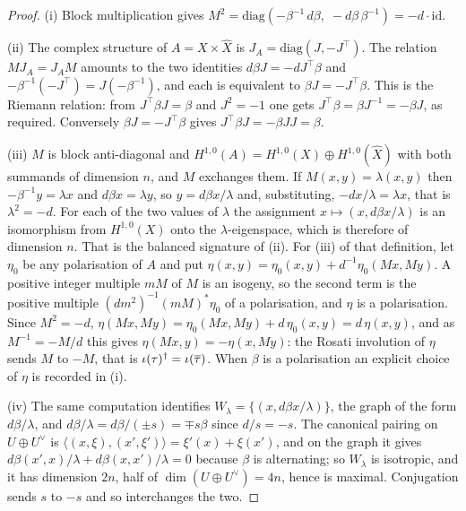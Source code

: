 \begin{proof}
(i) Block multiplication gives
$M^{2}=\mathrm{diag}(-\beta^{-1}\,d\beta,\;-d\beta\,\beta^{-1})=-d\cdot\mathrm{id}$.

(ii) The complex structure of $A=X\times\widehat{X}$ is
$J_{A}=\mathrm{diag}(J,-J^{\top})$. The relation $MJ_{A}=J_{A}M$ amounts to
the two identities $d\beta J=-dJ^{\top}\beta$ and
$-\beta^{-1}(-J^{\top})=J(-\beta^{-1})$, and each is equivalent to
$\beta J=-J^{\top}\beta$. This is the Riemann relation: from
$J^{\top}\beta J=\beta$ and $J^{2}=-1$ one gets
$J^{\top}\beta=\beta J^{-1}=-\beta J$, as required. Conversely
$\beta J=-J^{\top}\beta$ gives $J^{\top}\beta J=-\beta J J=\beta$.

(iii) $M$ is block anti-diagonal and $H^{1,0}(A)=H^{1,0}(X)\oplus
H^{1,0}(\widehat{X})$ with both summands of dimension $n$, and $M$ exchanges
them. If $M(x,y)=\lambda(x,y)$ then $-\beta^{-1}y=\lambda x$ and
$d\beta x=\lambda y$, so $y=d\beta x/\lambda$ and, substituting,
$-dx/\lambda=\lambda x$, that is $\lambda^{2}=-d$. For each of
the two values of $\lambda$ the assignment $x\mapsto(x,d\beta x/\lambda)$ is an
isomorphism from $H^{1,0}(X)$ onto the $\lambda$-eigenspace, which is
therefore of dimension $n$. That is the balanced signature of
(ii). For (iii) of that definition, let $\eta_{0}$ be any
polarisation of $A$ and put
$\eta(x,y)=\eta_{0}(x,y)+d^{-1}\eta_{0}(Mx,My)$. A positive integer multiple
$mM$ of $M$ is an isogeny, so the second term is the positive multiple
$(dm^{2})^{-1}(mM)^{*}\eta_{0}$ of a polarisation, and $\eta$ is a
polarisation. Since $M^{2}=-d$,
$\eta(Mx,My)=\eta_{0}(Mx,My)+d\,\eta_{0}(x,y)=d\,\eta(x,y)$, and as
$M^{-1}=-M/d$ this gives $\eta(Mx,y)=-\eta(x,My)$: the Rosati involution of
$\eta$ sends $M$ to $-M$, that is $\iota(\tau)^{\dagger}=\iota(\overline{\tau})$.
When $\beta$ is a polarisation an explicit choice of $\eta$ is recorded in
(i).

(iv) The same computation identifies $W_{\lambda}=\{(x,d\beta x/\lambda)\}$,
the graph of the form $d\beta/\lambda$, and
$d\beta/\lambda=d\beta/(\pm s)=\mp s\beta$ since $d/s=-s$. The canonical
pairing on $U\oplus U^{\vee}$ is
$\langle(x,\xi),(x',\xi')\rangle=\xi'(x)+\xi(x')$, and on the graph it gives
$d\beta(x',x)/\lambda+d\beta(x,x')/\lambda=0$ because $\beta$ is alternating; so
$W_{\lambda}$ is isotropic, and it has dimension $2n$, half of
$\dim(U\oplus U^{\vee})=4n$, hence is maximal. Conjugation sends $s$ to $-s$
and so interchanges the two.
\end{proof}

